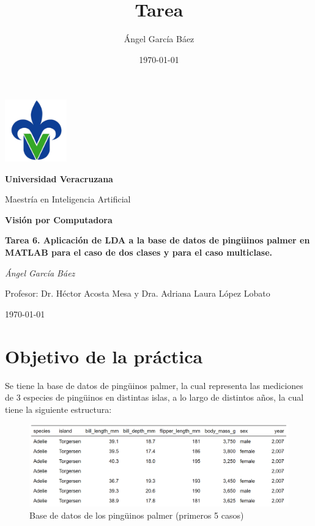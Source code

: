 \documentclass[11pt, letterpaper]{article}
\title{\bfseries Tarea}
\author{Ángel García Báez}
\date{\today}
\begin{document}
	
	\begin{titlepage}
		\centering
		\includegraphics[width=0.2\textwidth]{logo.png}\par
		\vspace{1cm}
		{\LARGE \bfseries Universidad Veracruzana \par}
		\vspace{1cm}
		{\Large Maestría en Inteligencia Artificial\par}
		\vspace{3cm}
		{\LARGE \bfseries Visión por Computadora \par}
		\vspace{1cm}
		{\Large \bfseries Tarea 6. Aplicación de LDA a la base de datos de pingüinos palmer en MATLAB para el caso de dos clases y para el caso multiclase. \par}
		\vfill
		{\Large \textit{Ángel García Báez}\par}
		\vspace{1cm}
		{\Large Profesor: Dr. Héctor Acosta Mesa y Dra. Adriana Laura López Lobato\par}
		\vfill
		{\Large \today \par}
	\end{titlepage}
	
	\newpage
	\tableofcontents
	\newpage
	
\section{Objetivo de la práctica}
	
Se tiene la base de datos de pingüinos palmer, la cual representa las mediciones de 3 especies de pingüinos en distintas islas, a lo largo de distintos años, la cual tiene la siguiente estructura:


\begin{figure}[h!]
	\centering
	\begin{minipage}{1\textwidth}
		\centering
		\includegraphics[width=\textwidth]{IMG/T1.png}
		\caption{Base de datos de los pingüinos palmer (primeros 5 casos)}
		\label{fig:f1}
	\end{minipage}\hfill
\end{figure}
\end{document}
